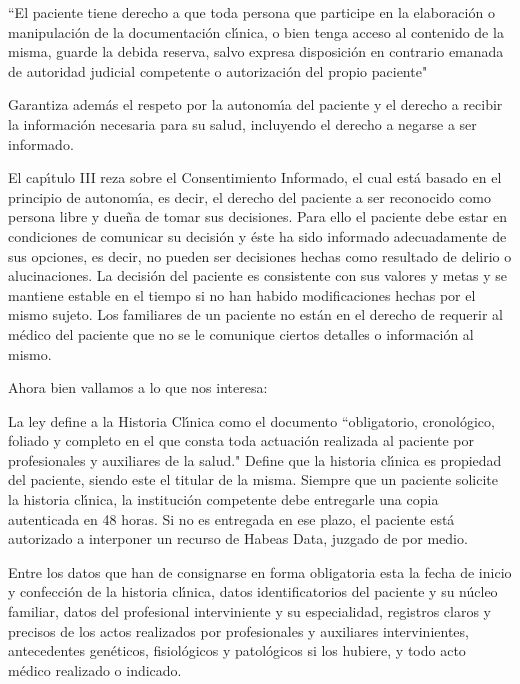 ``El paciente tiene derecho a que toda persona que participe en la elaboraci\'on 
o manipulaci\'on de la documentaci\'on cl\'{\i}nica, o bien tenga acceso al contenido de 
la misma, guarde la debida reserva, salvo expresa disposici\'on en contrario 
emanada de autoridad judicial competente o autorizaci\'on del propio paciente"

Garantiza adem\'as el respeto por la autonom\'{\i}a del paciente y el derecho a recibir 
la informaci\'on necesaria para su salud, incluyendo el derecho a negarse a ser 
informado.

El cap\'{\i}tulo III reza sobre el Consentimiento Informado, el cual est\'a basado en 
el principio de autonom\'{\i}a, es decir, el derecho del paciente a ser reconocido 
como persona libre y due\~na de tomar sus decisiones. Para ello el paciente debe estar en 
condiciones de comunicar su decisi\'on y  \'este ha sido informado adecuadamente de 
sus opciones, es decir, no pueden ser decisiones hechas como resultado de delirio 
o alucinaciones. La decisi\'on del paciente es consistente con sus valores y metas 
y se mantiene estable en el tiempo si no han habido modificaciones hechas por
el mismo sujeto. Los familiares de un paciente no est\'an en el derecho de 
requerir al m\'edico del paciente que no se le comunique ciertos detalles o
informaci\'on al mismo. 

Ahora bien vallamos a lo que nos interesa:

La ley define a la Historia Cl\'{\i}nica como el documento ``obligatorio, cronol\'ogico,
foliado y completo en el que consta toda actuaci\'on realizada al paciente por
profesionales y auxiliares de la salud." Define que la historia cl\'{\i}nica es 
propiedad del paciente, siendo este el titular de la misma. Siempre que un paciente 
solicite la historia cl\'{\i}nica, la instituci\'on competente debe entregarle una copia
autenticada en 48 horas. Si no es entregada en ese plazo, el
paciente est\'a autorizado a interponer un recurso de Habeas Data, juzgado de por 
medio. 

Entre los datos que han de consignarse en forma obligatoria esta la fecha de 
inicio y confecci\'on de la historia cl\'{\i}nica, datos identificatorios del paciente
y su n\'ucleo familiar, datos del profesional interviniente y su especialidad, 
registros claros y precisos de los actos realizados por profesionales y auxiliares
intervinientes, antecedentes gen\'eticos, fisiol\'ogicos y patol\'ogicos si los hubiere,
y todo acto m\'edico realizado o indicado.


